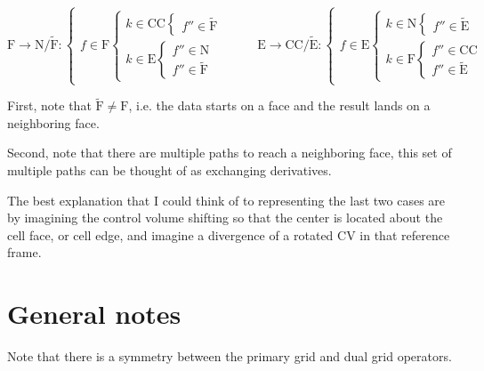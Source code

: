 \documentclass[11pt]{article}
\begin{document}
\begin{equation}
	\text{F} \rightarrow \text{N}/\tilde{\text{F}} :
	\begin{cases}
		f \in \text{F}
		\begin{cases}
		k \in \text{CC}
			\begin{cases}
			f'' \in \tilde{\text{F}}
			\end{cases}
		\\
		k \in \text{E}
			\begin{cases}
			f'' \in \text{N} \\
			f'' \in \tilde{\text{F}}
			\end{cases}
		\end{cases}
	\end{cases}
	\qquad
	\text{E} \rightarrow \text{CC}/\tilde{\text{E}} :
	\begin{cases}
		f \in \text{E}
		\begin{cases}
		k \in \text{N}
			\begin{cases}
			f'' \in \tilde{\text{E}}
			\end{cases}
		\\
		k \in \text{F}
			\begin{cases}
			f'' \in \text{CC} \\
			f'' \in \tilde{\text{E}}
			\end{cases}
		\end{cases}
	\end{cases}
\end{equation}

First, note that $\tilde{\text{F}} \ne \text{F}$, i.e. the data starts on a face and the result lands on a neighboring face.

Second, note that there are multiple paths to reach a neighboring face, this set of multiple paths can be thought of as exchanging derivatives.

The best explanation that I could think of to representing the last two cases are by imagining the control volume shifting so that the center is located about the cell face, or cell edge, and imagine a divergence of a rotated CV in that reference frame.

\section{General notes}

Note that there is a symmetry between the primary grid and dual grid operators.
\end{document}
